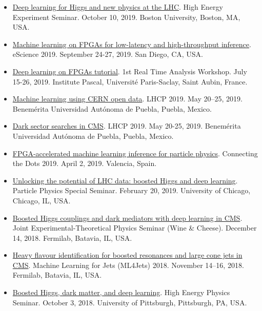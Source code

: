 \documentclass[11pt]{res}
\begin{document}
\begin{resume}
\begin{itemize}
    \item \href{http://physics.bu.edu/events/show/2204}{Deep learning for Higgs and new physics at the LHC}. High Energy Experiment Seminar. October 10, 2019. Boston University, Boston, MA, USA.
    \item \href{https://escience2019.sdsc.edu/program}{Machine learning on FPGAs for low-latency and high-throughput inference}. eScience 2019. September 24-27, 2019. San Diego, CA, USA.
    \item \href{https://indico.cern.ch/event/793125/contributions/3495251/}{Deep learning on FPGAs tutorial}. 1st Real Time Analysis Workshop. July 15-26, 2019. Institute Pascal, Universit\'{e} Paris-Saclay, Saint Aubin, France.
    \item \href{https://indico.cern.ch/event/687651/contributions/3428206/}{Machine learning using CERN open data}. LHCP 2019. May 20--25, 2019. Benem\'{e}rita Universidad Aut\'{o}noma de Puebla, Puebla, Mexico.
    \item \href{https://indico.cern.ch/event/687651/contributions/3426898/}{Dark sector searches in CMS}. LHCP 2019. May 20-25, 2019. Benem\'{e}rita Universidad Aut\'{o}noma de Puebla, Puebla, Mexico.
    \item \href{https://indico.cern.ch/event/742793/contributions/3274392/}{FPGA-accelerated machine learning inference for particle physics}. Connecting the Dots 2019. April 2, 2019. Valencia, Spain.
    \item \href{https://universityofchicago.hosted.panopto.com/Panopto/Pages/Viewer.aspx?id=66ca09d7-74c1-4b12-bb57-a9fa01046cdf}{Unlocking the potential of LHC data: boosted Higgs and deep learning}. Particle Physics Special Seminar. February 20, 2019. University of Chicago, Chicago, IL, USA.
    \item \href{http://theory.fnal.gov/events/event/results-from-cms-18/}{Boosted Higgs couplings and dark mediators with deep learning in CMS}. Joint Experimental-Theoretical Physics Seminar (Wine \& Cheese). December 14, 2018. Fermilab, Batavia, IL, USA.
    \item \href{https://indico.cern.ch/event/745718/contributions/3211982/}{Heavy flavour identification for boosted resonances and large cone jets in CMS}. Machine Learning for Jets (ML4Jets) 2018. November 14--16, 2018. Fermilab, Batavia, IL, USA.
    \item \href{https://www.physicsandastronomy.pitt.edu/events/hep-seminar-javier-duarte-fermilab}{Boosted Higgs, dark matter, and deep learning}. High Energy Physics Seminar. October 3, 2018. University of Pittsburgh, Pittsburgh, PA, USA.

\end{itemize}
\end{resume}
\end{document}
